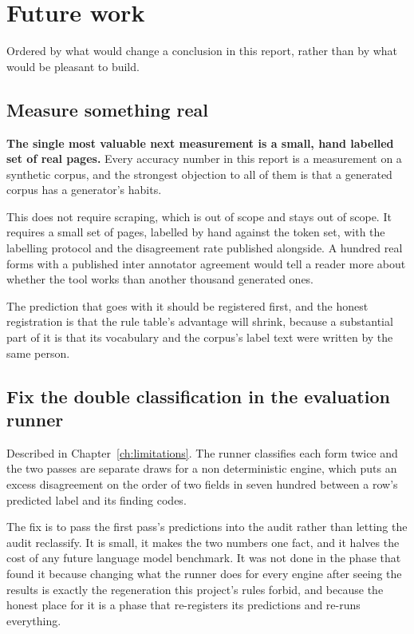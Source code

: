 \chapter{Future work}
\label{ch:future}

Ordered by what would change a conclusion in this report, rather than by what
would be pleasant to build.

\section{Measure something real}

\textbf{The single most valuable next measurement is a small, hand labelled set
of real pages.} Every accuracy number in this report is a measurement on a
synthetic corpus, and the strongest objection to all of them is that a generated
corpus has a generator's habits.

This does not require scraping, which is out of scope and stays out of scope.
It requires a small set of pages, labelled by hand against the token set, with
the labelling protocol and the disagreement rate published alongside. A hundred
real forms with a published inter annotator agreement would tell a reader more
about whether the tool works than another thousand generated ones.

The prediction that goes with it should be registered first, and the honest
registration is that the rule table's advantage will shrink, because a
substantial part of it is that its vocabulary and the corpus's label text were
written by the same person.

\section{Fix the double classification in the evaluation runner}

Described in Chapter~\ref{ch:limitations}. The runner classifies each form twice
and the two passes are separate draws for a non deterministic engine, which puts
an excess disagreement on the order of two fields in seven hundred between a
row's predicted label and its finding codes.

The fix is to pass the first pass's predictions into the audit rather than
letting the audit reclassify. It is small, it makes the two numbers one fact, and
it halves the cost of any future language model benchmark. It was not done in the
phase that found it because changing what the runner does for every engine after
seeing the results is exactly the regeneration this project's rules forbid, and
because the honest place for it is a phase that re-registers its predictions and
re-runs everything.

